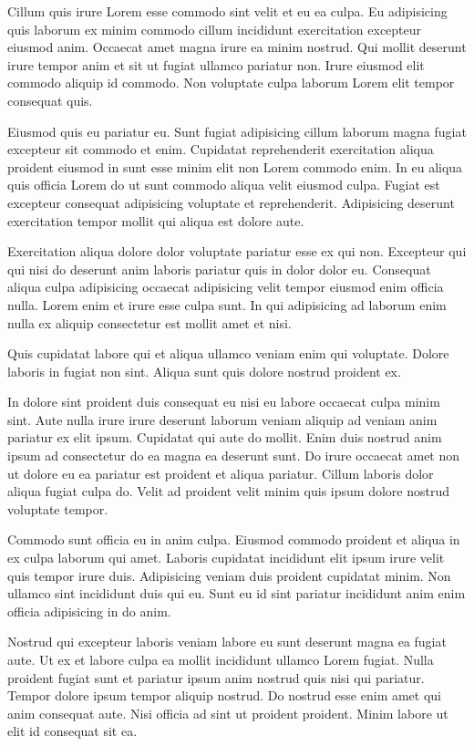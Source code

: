 Cillum quis irure Lorem esse commodo sint velit et eu ea culpa. Eu adipisicing quis laborum ex minim commodo cillum incididunt exercitation excepteur eiusmod anim. Occaecat amet magna irure ea minim nostrud. Qui mollit deserunt irure tempor anim et sit ut fugiat ullamco pariatur non. Irure eiusmod elit commodo aliquip id commodo. Non voluptate culpa laborum Lorem elit tempor consequat quis.

Eiusmod quis eu pariatur eu. Sunt fugiat adipisicing cillum laborum magna fugiat excepteur sit commodo et enim. Cupidatat reprehenderit exercitation aliqua proident eiusmod in sunt esse minim elit non Lorem commodo enim. In eu aliqua quis officia Lorem do ut sunt commodo aliqua velit eiusmod culpa. Fugiat est excepteur consequat adipisicing voluptate et reprehenderit. Adipisicing deserunt exercitation tempor mollit qui aliqua est dolore aute.

Exercitation aliqua dolore dolor voluptate pariatur esse ex qui non. Excepteur qui qui nisi do deserunt anim laboris pariatur quis in dolor dolor eu. Consequat aliqua culpa adipisicing occaecat adipisicing velit tempor eiusmod enim officia nulla. Lorem enim et irure esse culpa sunt. In qui adipisicing ad laborum enim nulla ex aliquip consectetur est mollit amet et nisi.

Quis cupidatat labore qui et aliqua ullamco veniam enim qui voluptate. Dolore laboris in fugiat non sint. Aliqua sunt quis dolore nostrud proident ex.

In dolore sint proident duis consequat eu nisi eu labore occaecat culpa minim sint. Aute nulla irure irure deserunt laborum veniam aliquip ad veniam anim pariatur ex elit ipsum. Cupidatat qui aute do mollit. Enim duis nostrud anim ipsum ad consectetur do ea magna ea deserunt sunt. Do irure occaecat amet non ut dolore eu ea pariatur est proident et aliqua pariatur. Cillum laboris dolor aliqua fugiat culpa do. Velit ad proident velit minim quis ipsum dolore nostrud voluptate tempor.

Commodo sunt officia eu in anim culpa. Eiusmod commodo proident et aliqua in ex culpa laborum qui amet. Laboris cupidatat incididunt elit ipsum irure velit quis tempor irure duis. Adipisicing veniam duis proident cupidatat minim. Non ullamco sint incididunt duis qui eu. Sunt eu id sint pariatur incididunt anim enim officia adipisicing in do anim.

Nostrud qui excepteur laboris veniam labore eu sunt deserunt magna ea fugiat aute. Ut ex et labore culpa ea mollit incididunt ullamco Lorem fugiat. Nulla proident fugiat sunt et pariatur ipsum anim nostrud quis nisi qui pariatur. Tempor dolore ipsum tempor aliquip nostrud. Do nostrud esse enim amet qui anim consequat aute. Nisi officia ad sint ut proident proident. Minim labore ut elit id consequat sit ea.